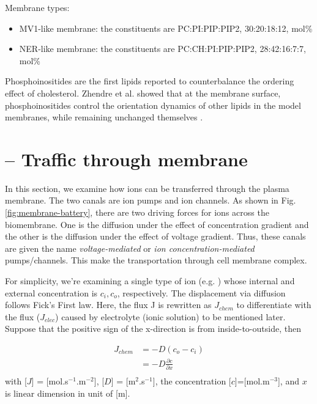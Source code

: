 Membrane types:
\begin{itemize}
  \item MV1-like membrane: the constituents are 
  PC:PI:PIP:PIP2, 30:20:18:12, mol\%
  
  \item NER-like membrane: the constituents are PC:CH:PI:PIP:PIP2, 28:42:16:7:7,
  mol\%
\end{itemize}
Phosphoinositides are the first lipids reported to counterbalance the ordering
effect of cholesterol. Zhendre et al. showed that at the membrane surface,
phosphoinositides control the orientation dynamics of other lipids in the model
membranes, while remaining unchanged themselves \citep{zhendre2011}.


\section{-- Traffic through membrane}
\label{sec:membrane-trafficking}

In this section, we examine how ions can be transferred through the
plasma membrane. The two canals are ion pumps and ion channels. As
shown in Fig. \ref{fig:membrane-battery}, there are two driving forces
for ions across the biomembrane. One is the diffusion under the effect
of concentration gradient and the other is the diffusion under the
effect of voltage gradient. Thus, these canals are given the name
{\it voltage-mediated} or {\it ion concentration-mediated}
pumps/channels. This make the transportation through cell membrane
complex.

For simplicity, we're examining a single type of ion (e.g. )
whose internal and external concentration is $c_i, c_o$,
respectively. The displacement via diffusion follows Fick's First
law. Here, the flux J is rewritten as $J_{chem}$ to differentiate with
the flux ($J_{elec}$) caused by electrolyte (ionic solution) to be
mentioned later. Suppose that the positive sign of the x-direction is
from inside-to-outside, then


\begin{equation}\label{eq:J_chem}
  \begin{split}
    J_{chem} &= -D (c_o-c_i) \\
    &= -D \frac{\partial c}{\partial x}\\
  \end{split}
\end{equation}
with [$J$] = [mol.s$^{-1}$.m$^{-2}$], [$D$] = [m$^2$.s$^{-1}$], the
concentration [$c$]=[mol.m$^{-3}$], and $x$ is linear dimension in
unit of [m].



